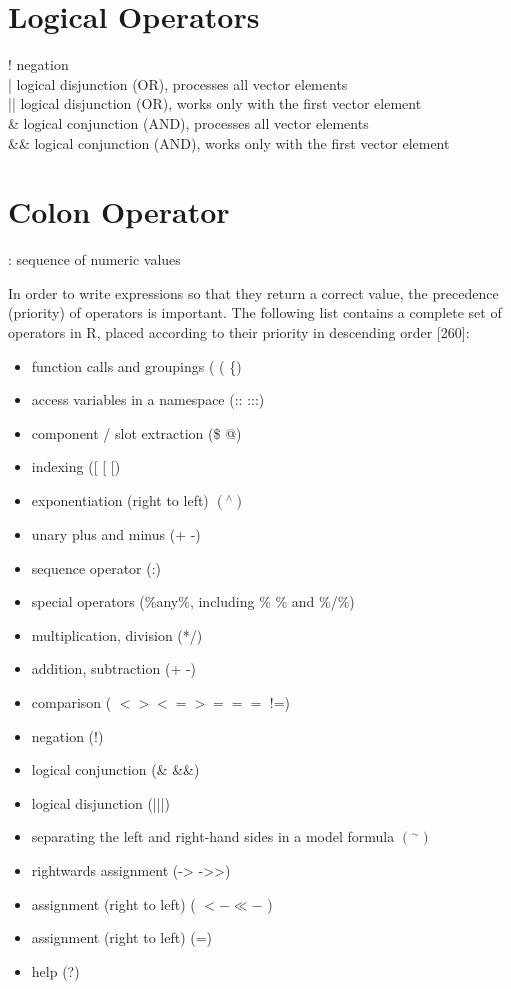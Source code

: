 \documentclass[10pt]{book}
\begin{document}
\section*{Logical Operators}
\begin{displayquote}
! negation\\
| logical disjunction (OR), processes all vector elements\\
|| logical disjunction (OR), works only with the first vector element\\
\& logical conjunction (AND), processes all vector elements\\
\&\& logical conjunction (AND), works only with the first vector element
\end{displayquote}

\section*{Colon Operator}
: sequence of numeric values

In order to write expressions so that they return a correct value, the precedence (priority) of operators is important. The following list contains a complete set of operators in R, placed according to their priority in descending order [260]:

\begin{itemize}
  \item function calls and groupings ( ( \{)
  \item access variables in a namespace (:: :::)
  \item component / slot extraction (\$ @)
  \item indexing ([ [ [)
  \item exponentiation (right to left) $\left({ }^{\wedge}\right)$
  \item unary plus and minus (+ -)
  \item sequence operator (:)
  \item special operators (\%any\%, including \% \% and \%/\%)
  \item multiplication, division (*/)
  \item addition, subtraction (+ -)
  \item comparison ( $<><=>===$ !=)
  \item negation (!)
  \item logical conjunction (\& \&\&)
  \item logical disjunction (|||)
  \item separating the left and right-hand sides in a model formula $\left({ }^{\sim}\right)$
  \item rightwards assignment (-> ->>)
  \item assignment (right to left) ( $<-\ll-$ )
  \item assignment (right to left) (=)
  \item help (?)
\end{itemize}
\end{document}
